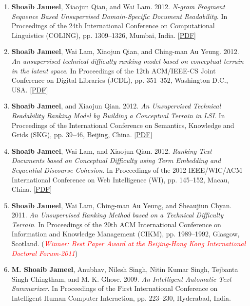 \documentclass[margin]{res}
\begin{document}
\begin{resume}
\begin{enumerate}
\item  \textbf{Shoaib Jameel}, Xiaojun Qian, and Wai Lam. 2012. \textit{N-gram Fragment Sequence Based Unsupervised Domain-Specific Document Readability}. In Proceedings of the 24th International Conference on Computational Linguistics (COLING), pp. 1309--1326, Mumbai, India. [\href{http://www.aclweb.org/anthology/C12-1080}{PDF}]\\

\item  \textbf{Shoaib Jameel}, Wai Lam, Xiaojun Qian, and Ching-man Au Yeung. 2012. \textit{An unsupervised technical difficulty ranking model based on conceptual terrain in the latent space}. In Proceedings of the 12th ACM/IEEE-CS Joint Conference on Digital Libraries (JCDL), pp. 351--352, Washington D.C., USA. [\href{https://drive.google.com/file/d/1uLTRvw9sQchIj0FF3A2tWTduNGedOIo4/view?usp=sharing}{PDF}]\\

\item  \textbf{Shoaib Jameel}, and Xiaojun Qian. 2012. \textit{An Unsupervised Technical Readability Ranking Model by Building a Conceptual Terrain in LSI}. In Proceedings of the International Conference on Semantics, Knowledge and Grids (SKG), pp. 39--46, Beijing, China. [\href{https://drive.google.com/file/d/1z-6qqTff1fo8LbmOfcTyIps6WGGNizd1/view?usp=sharing}{PDF}]\\

\item  \textbf{Shoaib Jameel}, Wai Lam, and Xiaojun Qian. 2012. \textit{Ranking Text Documents based on Conceptual Difficulty using Term Embedding and Sequential Discourse Cohesion}. In Proceedings of the 2012 IEEE/WIC/ACM International Conference on Web Intelligence (WI), pp. 145--152, Macau, China. [\href{https://drive.google.com/file/d/1eGZ6GZ8-tf2pWaQtCutobVG5kleL6yfG/view?usp=sharing}{PDF}]\\

\item  \textbf{Shoaib Jameel}, Wai Lam, Ching-man Au Yeung, and Sheaujiun Chyan. 2011. \textit{An Unsupervised Ranking Method based on a Technical Difficulty Terrain}. In Proceedings of the 20th ACM International Conference on Information and Knowledge Management (CIKM), pp. 1989--1992, Glasgow, Scotland. (\textit{\textcolor{red}{Winner: Best Paper Award at the Beijing-Hong Kong International Doctoral Forum-2011}}) \\

\item \textbf{M. Shoaib Jameel}, Anubhav, Nilesh Singh, Nitin Kumar Singh, Tejbanta Singh Chingtham, and M. K. Ghose. 2009. \textit{An Intelligent Automatic Text Summarizer}. In Proceedings of the First International Conference on Intelligent Human Computer Interaction, pp. 223--230, Hyderabad, India.\\


\end{enumerate}
\end{resume}
\end{document}
